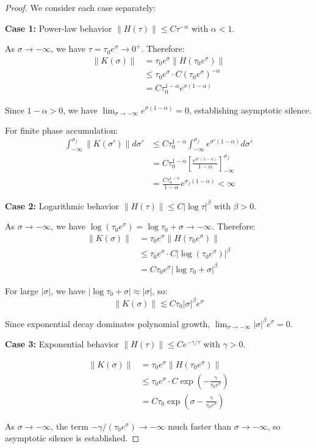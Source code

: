 \begin{proof}
We consider each case separately:

\textbf{Case 1:} Power-law behavior $\|H(\tau)\| \leq C \tau^{-\alpha}$ with $\alpha < 1$.

As $\sigma \to -\infty$, we have $\tau = \tau_0 e^\sigma \to 0^+$. Therefore:
\begin{align}
\|K(\sigma)\| &= \tau_0 e^\sigma \|H(\tau_0 e^\sigma)\| \\
&\leq \tau_0 e^\sigma \cdot C (\tau_0 e^\sigma)^{-\alpha} \\
&= C \tau_0^{1-\alpha} e^{\sigma(1-\alpha)}
\end{align}

Since $1-\alpha > 0$, we have $\lim_{\sigma \to -\infty} e^{\sigma(1-\alpha)} = 0$, establishing asymptotic silence.

For finite phase accumulation:
\begin{align}
\int_{-\infty}^{\sigma_f} \|K(\sigma')\| d\sigma' &\leq C \tau_0^{1-\alpha} \int_{-\infty}^{\sigma_f} e^{\sigma'(1-\alpha)} d\sigma' \\
&= C \tau_0^{1-\alpha} \left[ \frac{e^{\sigma'(1-\alpha)}}{1-\alpha} \right]_{-\infty}^{\sigma_f} \\
&= \frac{C \tau_0^{1-\alpha}}{1-\alpha} e^{\sigma_f(1-\alpha)} < \infty
\end{align}

\textbf{Case 2:} Logarithmic behavior $\|H(\tau)\| \leq C |\log \tau|^{\beta}$ with $\beta > 0$.

As $\sigma \to -\infty$, we have $\log(\tau_0 e^\sigma) = \log \tau_0 + \sigma \to -\infty$. Therefore:
\begin{align}
\|K(\sigma)\| &= \tau_0 e^\sigma \|H(\tau_0 e^\sigma)\| \\
&\leq \tau_0 e^\sigma \cdot C |\log(\tau_0 e^\sigma)|^{\beta} \\
&= C \tau_0 e^\sigma |\log \tau_0 + \sigma|^{\beta}
\end{align}

For large $|\sigma|$, we have $|\log \tau_0 + \sigma| \approx |\sigma|$, so:
\begin{equation}
\|K(\sigma)\| \lesssim C \tau_0 |\sigma|^{\beta} e^\sigma
\end{equation}

Since exponential decay dominates polynomial growth, $\lim_{\sigma \to -\infty} |\sigma|^{\beta} e^\sigma = 0$.

\textbf{Case 3:} Exponential behavior $\|H(\tau)\| \leq C e^{-\gamma/\tau}$ with $\gamma > 0$.

\begin{align}
\|K(\sigma)\| &= \tau_0 e^\sigma \|H(\tau_0 e^\sigma)\| \\
&\leq \tau_0 e^\sigma \cdot C \exp\left(-\frac{\gamma}{\tau_0 e^\sigma}\right) \\
&= C \tau_0 \exp\left(\sigma - \frac{\gamma}{\tau_0 e^\sigma}\right)
\end{align}

As $\sigma \to -\infty$, the term $-\gamma/(\tau_0 e^\sigma) \to -\infty$ much faster than $\sigma \to -\infty$, so asymptotic silence is established.
\end{proof}

